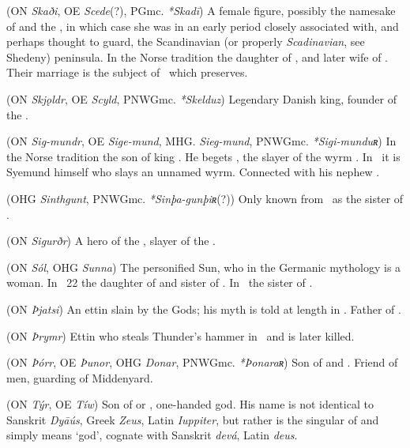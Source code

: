 \begin{itemize}
 (ON \emph{Skaði}, OE \emph{Scede}(?), PGmc. \emph{*Skadī})
  A female figure, possibly the namesake of  and the , in which case she was in an early period closely associated with, and perhaps thought to guard, the Scandinavian (or properly \emph{Scadinavian}, see Shedeny) peninsula.
  In the Norse tradition the daughter of , and later wife of .  Their marriage is the subject of \Gylfaginning\ which preserves.

 (ON \emph{Skjǫldr}, OE \emph{Scyld}, PNWGmc. \emph{*Skelduz})
  Legendary Danish king, founder of the .

 (ON \emph{Sig-mundr}, OE \emph{Sige-mund}, MHG. \emph{Sieg-mund}, PNWGmc. \emph{*Sigi-munduʀ})
  In the Norse tradition the son of king .  He begets , the slayer of the wyrm .  In \Beowulf\ it is Syemund himself who slays an unnamed wyrm.  Connected with his nephew .

 (OHG \emph{Sinthgunt}, PNWGmc. \emph{*Sinþa-gunþiʀ}(?))
  Only known from \MerseburgTwo\ as the sister of .

 (ON \emph{Sigurðr})
  A hero of the , slayer of the  .

 (ON \emph{Sól}, OHG \emph{Sunna})
  The personified Sun, who in the Germanic mythology is a woman.  In \Vafthrudnismal\ 22 the daughter of  and sister of .  In \MerseburgTwo\ the sister of .

 (ON \emph{Þjatsi})
  An ettin slain by the Gods; his myth is told at length in \Haustlong.  Father of .

 (ON \emph{Þrymr})
  Ettin who steals Thunder’s hammer in \Thrymskvida\ and is later killed.

 (ON \emph{Þórr}, OE \emph{Þunor}, OHG \emph{Donar}, PNWGmc. \emph{*Þonaraʀ})
  Son of  and .  Friend of men, guarding of Middenyard.

 (ON \emph{Týr}, OE \emph{Tíw})
  Son of  or , one-handed god.  His name is not identical to Sanskrit \emph{Dyāús}, Greek \emph{Zeus}, Latin \emph{Iuppiter}, but rather is the singular of  and simply means ‘god’, cognate with Sanskrit \emph{devá}, Latin \emph{deus}.


\end{itemize}
